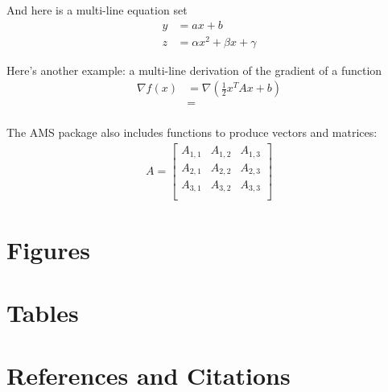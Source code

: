 \documentclass[10pt]{article}
\begin{document}
And here is a multi-line equation set
\begin{align}
    y &= ax + b \\                      %
    z &= \alpha x^2 + \beta x + \gamma  %
\end{align}

Here's another example: a multi-line derivation of the gradient of a function
\begin{align}
    \nabla f(x) &= \nabla ( \frac{1}{2} x^T A x + b ) \\
                 &= \\
\end{align}

The AMS package also includes functions to produce vectors and matrices:
\begin{align}
    A = \begin{bmatrix}    %
        A_{1,1} & A_{1,2} & A_{1,3} \\   %
        A_{2,1} & A_{2,2} & A_{2,3} \\
        A_{3,1} & A_{3,2} & A_{3,3} \\
    \end{bmatrix}
\end{align}




\section{Figures}


\section{Tables}



\section{References and Citations}
\end{document}
